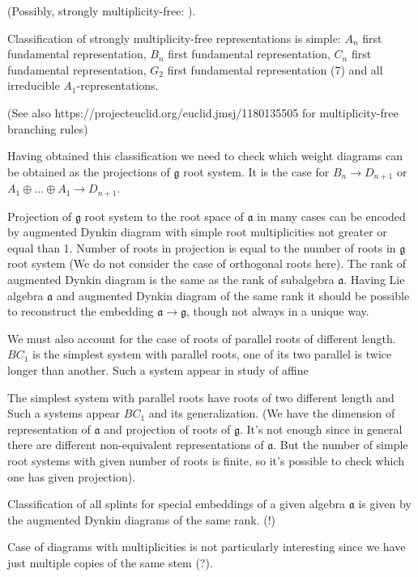 \documentclass{article}
\newcommand{\gf}{\mathfrak{g}}
\newcommand{\af}{\mathfrak{a}}
\begin{document}
 (Possibly, strongly multiplicity-free:
).


 Classification of strongly multiplicity-free representations is simple:
$A_{n}$ first fundamental representation, $B_{n}$ first fundamental representation, $C_{n}$ first
fundamental representation, $G_{2}$ first fundamental representation (7) and
all irreducible $A_{1}$-representations. 

(See also https://projecteuclid.org/euclid.jmsj/1180135505 for multiplicity-free branching rules)

Having obtained this classification we need to check which weight diagrams can be obtained as the
projections of $\gf$ root system. It is the case for $B_{n}\to D_{n+1}$ or $A_{1}\oplus\dots\oplus
A_{1}\to D_{n+1}$.



Projection of $\gf$ root system to the root space of $\af$ in many cases can be
encoded by augmented Dynkin diagram with simple root multiplicities not greater or equal than 1.
Number of roots in projection is equal to the number of roots in $\gf$ root system (We do
not consider the case of orthogonal roots here). The rank of augmented Dynkin diagram is the same as
the rank of subalgebra $\af$. Having Lie algebra $\af$ and augmented Dynkin
diagram of the same rank it should be possible to reconstruct the embedding $\af\to
\gf$, though not always in a unique way. 

We must also account for the case of roots of parallel roots of different length. $BC_{1} $ is the
simplest system with parallel roots, one of its two parallel is twice longer than another. Such a
system appear in study of affine 


 The simplest
system with parallel roots have roots of two different length and Such a systems
appear  $BC_{1} $ and its generalization. (We have the dimension of representation of $\af$ and
projection of roots of $\gf$. It's not enough since in general there are different non-equivalent
representations of $\af$. But the number of simple root systems with given number of roots is
finite, so it's possible to check which one has given projection).

Classification of all splints for special embeddings of a given algebra $\af$ is given by
the augmented Dynkin diagrams of the same rank. (!)

Case of diagrams with multiplicities is not particularly interesting since we have just multiple
copies of the same stem (?).
\end{document}
